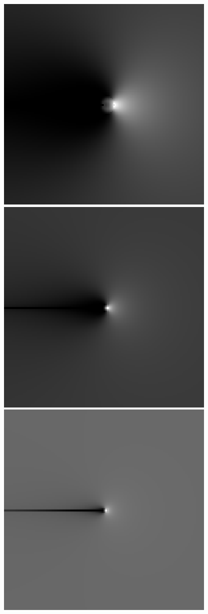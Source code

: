 \begin{figure}
 \centering
 \subbottom
 {
 \includegraphics[scale=1]{figures/dfilt_wr_sqrt2.png}
 }
 \subbottom
 {
 \includegraphics[scale=1]{figures/dfilt_wr_sqrt8.png}
 }
 \subbottom
 {
 \includegraphics[scale=1]{figures/dfilt_wr_sqrt50.png}
}
\end{figure}
